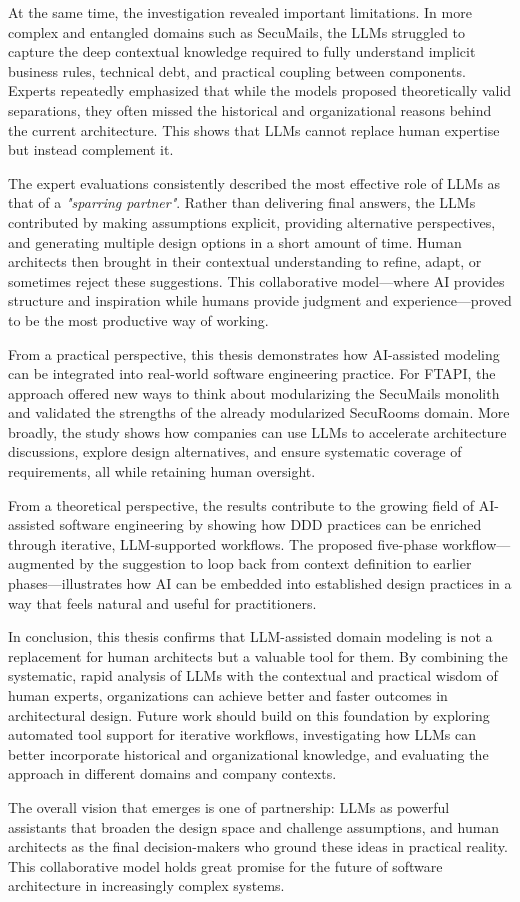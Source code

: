 At the same time, the investigation revealed important limitations. In more complex and entangled domains such as SecuMails, the LLMs struggled to capture the deep contextual knowledge required to fully understand implicit business rules, technical debt, and practical coupling between components. Experts repeatedly emphasized that while the models proposed theoretically valid separations, they often missed the historical and organizational reasons behind the current architecture. This shows that LLMs cannot replace human expertise but instead complement it.  

The expert evaluations consistently described the most effective role of LLMs as that of a \textit{"sparring partner"}. Rather than delivering final answers, the LLMs contributed by making assumptions explicit, providing alternative perspectives, and generating multiple design options in a short amount of time. Human architects then brought in their contextual understanding to refine, adapt, or sometimes reject these suggestions. This collaborative model—where AI provides structure and inspiration while humans provide judgment and experience—proved to be the most productive way of working.

From a practical perspective, this thesis demonstrates how AI-assisted modeling can be integrated into real-world software engineering practice. For FTAPI, the approach offered new ways to think about modularizing the SecuMails monolith and validated the strengths of the already modularized SecuRooms domain. More broadly, the study shows how companies can use LLMs to accelerate architecture discussions, explore design alternatives, and ensure systematic coverage of requirements, all while retaining human oversight.

From a theoretical perspective, the results contribute to the growing field of AI-assisted software engineering by showing how DDD practices can be enriched through iterative, LLM-supported workflows. The proposed five-phase workflow—augmented by the suggestion to loop back from context definition to earlier phases—illustrates how AI can be embedded into established design practices in a way that feels natural and useful for practitioners.

In conclusion, this thesis confirms that LLM-assisted domain modeling is not a replacement for human architects but a valuable tool for them. By combining the systematic, rapid analysis of LLMs with the contextual and practical wisdom of human experts, organizations can achieve better and faster outcomes in architectural design. Future work should build on this foundation by exploring automated tool support for iterative workflows, investigating how LLMs can better incorporate historical and organizational knowledge, and evaluating the approach in different domains and company contexts.  

The overall vision that emerges is one of partnership: LLMs as powerful assistants that broaden the design space and challenge assumptions, and human architects as the final decision-makers who ground these ideas in practical reality. This collaborative model holds great promise for the future of software architecture in increasingly complex systems.
